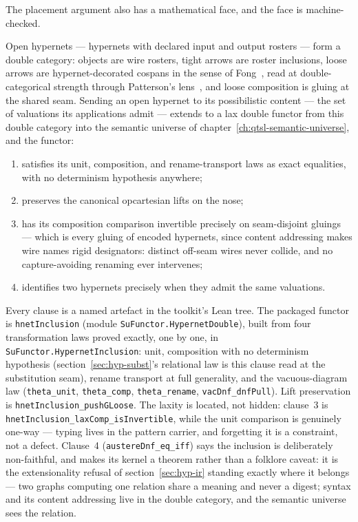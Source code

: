 \medskip

The placement argument also has a mathematical face, and the face is
machine-checked.

\begin{theorem}
\label{thm:hyp-inclusion}
Open hypernets --- hypernets with declared input and output rosters
--- form a double category: objects are wire rosters, tight arrows
are roster inclusions, loose arrows are hypernet-decorated cospans
in the sense of Fong~\cite{fong15}, read at double-categorical
strength through Patterson's lens~\cite{patterson23}, and loose
composition is gluing at the shared seam. Sending an open hypernet
to its possibilistic content --- the set of valuations its
applications admit --- extends to a lax double functor from this
double category into the semantic universe of
chapter~\ref{ch:qtsl-semantic-universe}, and the functor:
\begin{enumerate}
\item satisfies its unit, composition, and rename-transport laws as
  exact equalities, with no determinism hypothesis anywhere;
\item preserves the canonical opcartesian lifts on the nose;
\item has its composition comparison invertible precisely on
  seam-disjoint gluings --- which is every gluing of encoded
  hypernets, since content addressing makes wire names rigid
  designators: distinct off-seam wires never collide, and no
  capture-avoiding renaming ever intervenes;
\item identifies two hypernets precisely when they admit the same
  valuations.
\end{enumerate}
\end{theorem}

Every clause is a named artefact in the toolkit's Lean tree. The
packaged functor is \texttt{hnetInclusion} (module
\texttt{SuFunctor.HypernetDouble}), built from four transformation
laws proved exactly, one by one, in
\texttt{SuFunctor.HypernetInclusion}: unit, composition with no
determinism hypothesis (section~\ref{sec:hyp-subst}'s relational law
is this clause read at the substitution seam), rename transport at
full generality, and the vacuous-diagram law (\texttt{theta\_unit},
\texttt{theta\_comp}, \texttt{theta\_rename},
\texttt{vacDnf\_dnfPull}). Lift preservation is
\texttt{hnetInclusion\_pushGLoose}. The laxity is located, not
hidden: clause~3 is \texttt{hnetInclusion\_\allowbreak laxComp\_\allowbreak isInvertible},
while the unit comparison is genuinely one-way --- typing lives in
the pattern carrier, and forgetting it is a constraint, not a
defect. Clause~4 (\texttt{austereDnf\_eq\_iff}) says the inclusion
is deliberately non-faithful, and makes its kernel a theorem rather
than a folklore caveat: it is the extensionality refusal of
section~\ref{sec:hyp-ir} standing exactly where it belongs --- two
graphs computing one relation share a meaning and never a digest;
syntax and its content addressing live in the double category, and
the semantic universe sees the relation.

